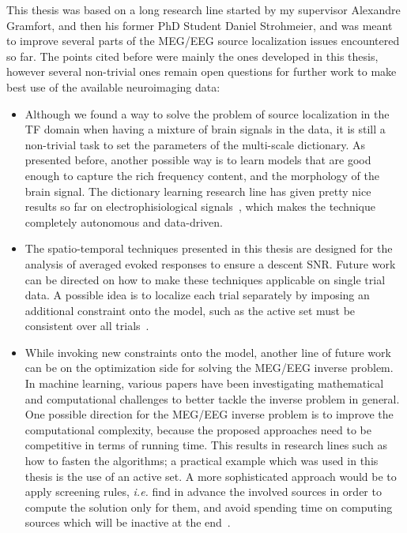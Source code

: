 This thesis was based on a long research line started by my supervisor Alexandre Gramfort, and then his former PhD Student Daniel Strohmeier, and was meant to improve several parts of the MEG/EEG source localization issues encountered so far. The points cited before were mainly the ones developed in this thesis, however several non-trivial ones remain open questions for further work to make best use of the available neuroimaging data:
\begin{itemize}
\item Although we found a way to solve the problem of source localization in the TF domain when having a mixture of brain signals in the data, it is still a non-trivial task to set the parameters of the multi-scale dictionary. As presented before, another possible way is to learn models that are good enough to capture the rich frequency content, and the morphology of the brain signal. The dictionary learning research line has given pretty nice results so far on electrophisiological signals~\cite{jas2017learning,jost2006motif,brockmeier2016learning,hitziger2017adaptive}, which makes the technique completely autonomous and data-driven.

\item The spatio-temporal techniques presented in this thesis are designed for the analysis of averaged evoked responses to ensure a descent SNR. Future work can be directed on how to make these techniques applicable on single trial data. A possible idea is to localize each trial separately by imposing an additional constraint onto the model, such as the active set must be consistent over all trials~\cite{strohmeier2012meg,strohmeier2012biomag}.

\item While invoking new constraints onto the model, another line of future work can be on the optimization side for solving the MEG/EEG inverse problem. In machine learning, various papers have been investigating mathematical and computational challenges to better tackle the inverse problem in general. One possible direction for the MEG/EEG inverse problem is to improve the computational complexity, because the proposed approaches need to be competitive in terms of running time. This results in research lines such as how to fasten the algorithms; a practical example which was used in this thesis is the use of an active set. A more sophisticated approach would be to apply screening rules, \textit{i.e.} find in advance the involved sources in order to compute the solution only for them, and avoid spending time on computing sources which will be inactive at the end~\cite{fercoq-etal:2015,massias2017safe,massiasgap,ndiaye2016gap,ndiaye2017efficient}.


\end{itemize}
